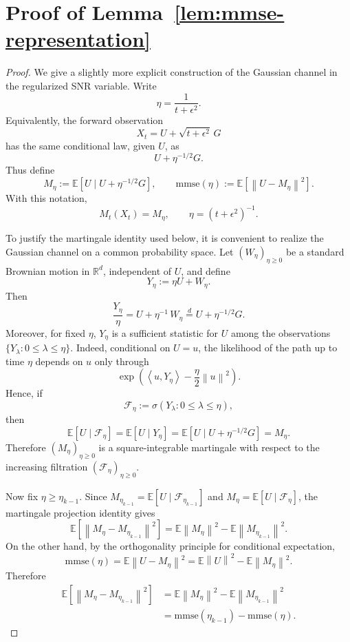 \documentclass[11pt]{article}
\newcommand{\E}{\mathbb{E}}
\newcommand{\mmse}{\mathrm{mmse}}
\newcommand{\eps}{\epsilon}
\newcommand{\norm}[1]{\left\lVert #1 \right\rVert}
\newcommand{\ip}[2]{\left\langle #1,#2\right\rangle}
\begin{document}
\section{Proof of Lemma~\ref{lem:mmse-representation}}
\label{app:lemma1proof}
\begin{proof}
We give a slightly more explicit construction of the Gaussian channel in the
regularized SNR variable. Write
\[
    \eta=\frac{1}{t+\eps^2}.
\]
Equivalently, the forward observation
\[
    X_t=U+\sqrt{t+\eps^2}\,G
\]
has the same conditional law, given \(U\), as
\[
    U+\eta^{-1/2}G .
\]
Thus define
\[
    M_\eta
    :=
    \E\!\left[U\mid U+\eta^{-1/2}G\right],
    \qquad
    \mmse(\eta)
    :=
    \E\!\left[\norm{U-M_\eta}^2\right].
\]
With this notation,
\[
    M_t(X_t)=M_\eta,
    \qquad
    \eta=(t+\eps^2)^{-1}.
\]

To justify the martingale identity used below, it is convenient to realize the
Gaussian channel on a common probability space. Let \((W_\eta)_{\eta\ge0}\) be
a standard Brownian motion in \(\mathbb R^d\), independent of \(U\), and define
\[
    Y_\eta:=\eta U+W_\eta .
\]
Then
\[
    \frac{Y_\eta}{\eta}
    =
    U+\eta^{-1}\,W_\eta
    \stackrel{d}{=}
    U+\eta^{-1/2}G .
\]
Moreover, for fixed \(\eta\), \(Y_\eta\) is a sufficient statistic for \(U\)
among the observations \(\{Y_\lambda:0\le\lambda\le\eta\}\). Indeed, conditional
on \(U=u\), the likelihood of the path up to time \(\eta\) depends on \(u\)
only through
\[
    \exp\!\left(
        \ip{u}{Y_\eta}
        -
        \frac{\eta}{2}\norm{u}^2
    \right).
\]
Hence, if
\[
    \mathcal F_\eta:=\sigma(Y_\lambda:0\le\lambda\le\eta),
\]
then
\[
    \E[U\mid \mathcal F_\eta]
    =
    \E[U\mid Y_\eta]
    =
    \E\!\left[U\mid U+\eta^{-1/2}G\right]
    =
    M_\eta .
\]
Therefore \((M_\eta)_{\eta\ge0}\) is a square-integrable martingale with
respect to the increasing filtration \((\mathcal F_\eta)_{\eta\ge0}\).

Now fix \(\eta\ge\eta_{k-1}\). Since \(M_{\eta_{k-1}}
=\E[U\mid\mathcal F_{\eta_{k-1}}]\) and
\(M_\eta=\E[U\mid\mathcal F_\eta]\), the martingale projection identity gives
\[
    \E\!\left[
        \norm{M_\eta-M_{\eta_{k-1}}}^2
    \right]
    =
    \E\norm{M_\eta}^2-\E\norm{M_{\eta_{k-1}}}^2 .
\]
On the other hand, by the orthogonality principle for conditional expectation,
\[
    \mmse(\eta)
    =
    \E\norm{U-M_\eta}^2
    =
    \E\norm{U}^2-\E\norm{M_\eta}^2 .
\]
Therefore
\[
\begin{aligned}
    \E\!\left[
        \norm{M_\eta-M_{\eta_{k-1}}}^2
    \right]
    &=
    \E\norm{M_\eta}^2-\E\norm{M_{\eta_{k-1}}}^2  \\
    &=
    \mmse(\eta_{k-1})-\mmse(\eta).
\end{aligned}
\]


\end{proof}
\end{document}
